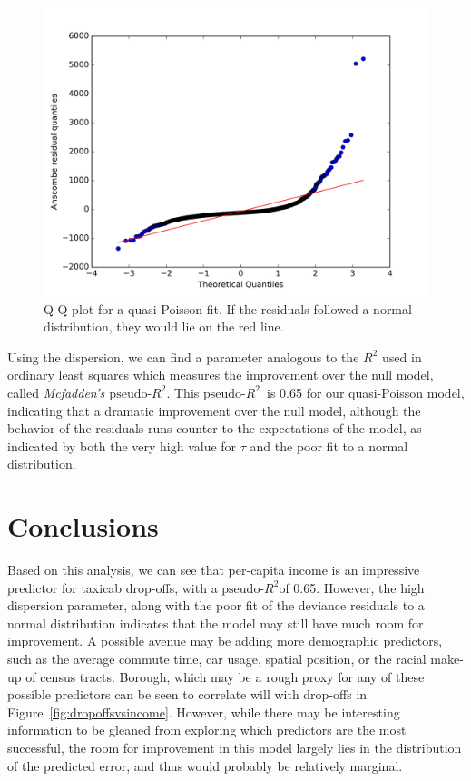\documentclass[11pt]{article}
\newcommand{\fref}[1]{Figure~\ref{fig:#1}}
\newcommand{\prsq}{$\mbox{pseudo-}R^2$}
\begin{document}
\begin{figure}[h]
  \centering
  \includegraphics[width=\textwidth]{2013quasi-poisson_QQ.png}
  \caption{ Q-Q plot for a quasi-Poisson fit. If the residuals followed a normal distribution, they would lie on the red line.
  \label{fig:qqplot}}

\end{figure}

Using the dispersion, we can find a parameter analogous to the $R^2$ used in ordinary least squares which measures the improvement over the null model, called {\it Mcfadden's $\mbox{pseudo-}R^2$}. This \prsq \ is 0.65 for our quasi-Poisson model, indicating that a dramatic improvement over the null model, although the behavior of the residuals runs counter to the expectations of the model, as indicated by both the very high value for $\tau$ and the poor fit to a normal distribution.



\section{Conclusions}

Based on this analysis, we can see that per-capita income is an impressive predictor for taxicab drop-offs, with a \prsq of 0.65.
However, the high dispersion parameter, along with the poor fit of the deviance residuals to a normal distribution indicates that the model may still have much room for improvement.
A possible avenue may be adding more demographic predictors, such as the average commute time, car usage, spatial position, or the racial make-up of census tracts. Borough, which may be a rough proxy for any of these possible predictors can be seen to correlate will with drop-offs in \fref{dropoffsvsincome}.
However, while there may be interesting information to be gleaned from exploring which predictors are the most successful, the room for improvement in this model largely lies in the distribution of the predicted error, and thus would probably be relatively marginal.
\end{document}
